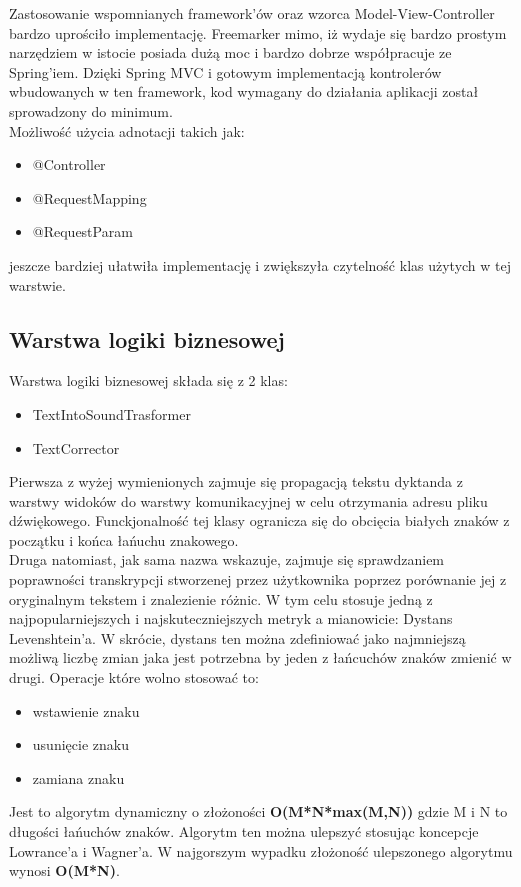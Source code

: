 Zastosowanie wspomnianych framework'ów oraz wzorca Model-View-Controller bardzo uprościło implementację. Freemarker mimo, iż wydaje się bardzo prostym narzędziem w istocie posiada dużą moc i bardzo dobrze współpracuje ze Spring'iem. Dzięki Spring MVC i gotowym implementacją kontrolerów wbudowanych w ten framework, kod wymagany do działania aplikacji został sprowadzony do minimum. \\
Możliwość użycia adnotacji takich jak:
\begin{itemize}
	\item @Controller
	\item @RequestMapping
	\item @RequestParam
\end{itemize}
jeszcze bardziej ułatwiła implementację i zwiększyła czytelność klas użytych w tej warstwie.
\subsection{Warstwa logiki biznesowej}
Warstwa logiki biznesowej składa się z 2 klas:
\begin{itemize}
	\item TextIntoSoundTrasformer
	\item TextCorrector
\end{itemize}
Pierwsza z wyżej wymienionych zajmuje się propagacją tekstu dyktanda z warstwy widoków do warstwy komunikacyjnej w celu otrzymania adresu pliku dźwiękowego. Funckjonalność tej klasy ogranicza się do obcięcia białych znaków z początku i końca łańuchu znakowego.\\
Druga natomiast, jak sama nazwa wskazuje, zajmuje się sprawdzaniem poprawności transkrypcji stworzenej przez użytkownika poprzez porównanie jej z oryginalnym tekstem i znalezienie różnic. W tym celu stosuje jedną z najpopularniejszych i najskuteczniejszych metryk a mianowicie: Dystans Levenshtein'a. W skrócie, dystans ten można zdefiniować jako najmniejszą możliwą liczbę zmian jaka jest potrzebna by jeden z łańcuchów znaków zmienić w drugi. Operacje które wolno stosować to:
\begin{itemize}
	\item wstawienie znaku
	\item usunięcie znaku
	\item zamiana znaku
\end{itemize}
Jest to algorytm dynamiczny o złożoności \textbf{O(M*N*max(M,N))} gdzie M i N to długości łańuchów znaków. Algorytm ten można ulepszyć stosując koncepcje Lowrance'a i Wagner'a. W najgorszym wypadku złożoność ulepszonego algorytmu wynosi \textbf{O(M*N)}.
